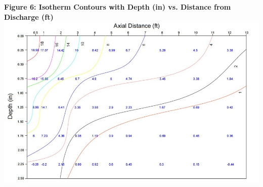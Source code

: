 \documentclass{article}
\begin{document}
\begin{center}
\newpage
{} 
{\bf {\large Figure 6: Isotherm Contours with Depth (in) vs. Distance from Discharge (ft)\\}}
\vspace{3mm}
\includegraphics*[scale=0.7]{fig6.jpg}

\end{center}
\end{document}
